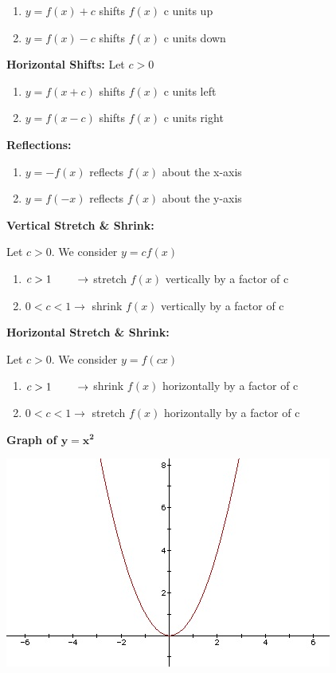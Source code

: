 \documentclass[12pt]{article}
\begin{document}
\begin{enumerate}
\item $y=f(x) + c$ shifts $f(x)$ c units up
\item $y=f(x) - c$ shifts $f(x)$ c units down
\end{enumerate}

\textbf{Horizontal Shifts:} Let $c>0$

\begin{enumerate}
\item $y=f(x+c)$ shifts $f(x)$ c units left
\item $y=f(x-c)$ shifts $f(x)$ c units right
\end{enumerate}

\textbf{Reflections:} 

\begin{enumerate}
\item $y=-f(x)$ reflects $f(x)$ about the x-axis
\item $y=f(-x)$ reflects $f(x)$ about the y-axis
\end{enumerate}

\textbf{Vertical Stretch \& Shrink:} 
\newline

\centerline{Let $c>0$. We consider $y=cf(x)$}

\begin{enumerate}
\item $c>1 \hspace{.75cm} \to$ stretch $f(x)$ vertically by a factor of c
\item $0<c<1 \to$ shrink $f(x)$ vertically by a factor of c
\end{enumerate}
\vspace{.5cm}
\textbf{Horizontal Stretch \& Shrink:} 
\newline

\centerline{Let $c>0$. We consider $y=f(cx)$}

\begin{enumerate}
\item $c>1 \hspace{.75cm} \to$ shrink $f(x)$ horizontally by a factor of c
\item $0<c<1 \to$ stretch $f(x)$ horizontally by a factor of c
\end{enumerate}

\newpage
\textbf{Graph of $\mathbf{y=x^2}$}

\includegraphics{Quadratic.jpg}
\end{document}
